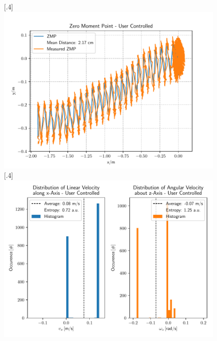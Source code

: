\begin{figure}[h]
	[.4\linewidth]{\includegraphics[scale=.35]{chapters/05_experiments/03_user_controlled_walking/out_of_sight_walk_01_zmp.pdf}}
	[.4\linewidth]{\includegraphics[scale=.35]{chapters/05_experiments/03_user_controlled_walking/out_of_sight_walk_01_entropy.pdf}}
	\caption{}
	\label{fig::52_uc_basic}
\end{figure} 